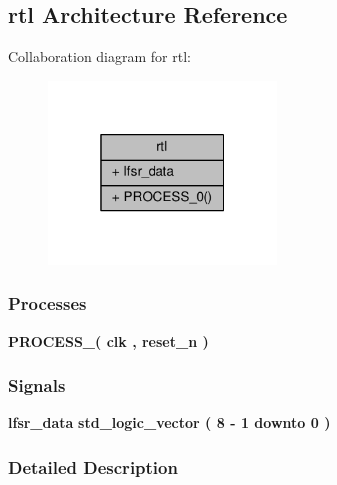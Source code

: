\subsection{rtl Architecture Reference}
\label{classddr2__ex__lfsr8_1_1rtl}


Collaboration diagram for rtl\+:\nopagebreak
\begin{figure}[H]
\begin{center}
\leavevmode
\includegraphics[width=172pt]{d7/d69/classddr2__ex__lfsr8_1_1rtl__coll__graph}
\end{center}
\end{figure}
\subsubsection*{Processes}
 \begin{DoxyCompactItemize}
\item 
{\bf P\+R\+O\+C\+E\+S\+S\+\_}{\bfseries  ( {\bfseries {\bfseries {\bf clk}} \textcolor{vhdlchar}{ }} , {\bfseries {\bfseries {\bf reset\+\_\+n}} \textcolor{vhdlchar}{ }} )}
\end{DoxyCompactItemize}
\subsubsection*{Signals}
 \begin{DoxyCompactItemize}
\item 
{\bf lfsr\+\_\+data} {\bfseries \textcolor{comment}{std\+\_\+logic\+\_\+vector}\textcolor{vhdlchar}{ }\textcolor{vhdlchar}{(}\textcolor{vhdlchar}{ }\textcolor{vhdlchar}{ } \textcolor{vhdldigit}{8} \textcolor{vhdlchar}{-\/}\textcolor{vhdlchar}{ } \textcolor{vhdldigit}{1} \textcolor{vhdlchar}{ }\textcolor{keywordflow}{downto}\textcolor{vhdlchar}{ }\textcolor{vhdlchar}{ } \textcolor{vhdldigit}{0} \textcolor{vhdlchar}{ }\textcolor{vhdlchar}{)}\textcolor{vhdlchar}{ }} 
\end{DoxyCompactItemize}


\subsubsection{Detailed Description}


